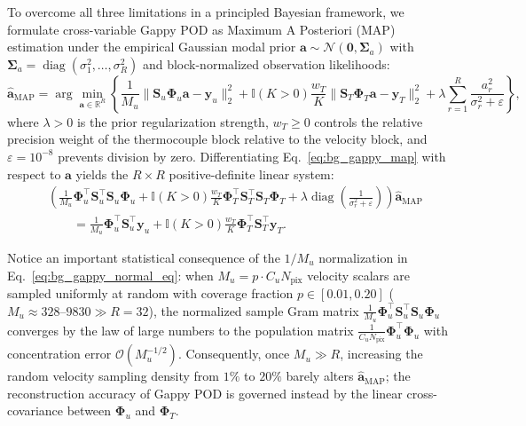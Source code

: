 To overcome all three limitations in a principled Bayesian framework, we formulate cross-variable Gappy POD as Maximum A Posteriori (MAP) estimation under the empirical Gaussian modal prior $\mathbf{a} \sim \mathcal{N}(\mathbf{0}, \boldsymbol{\Sigma}_a)$ with $\boldsymbol{\Sigma}_a = \operatorname{diag}(\sigma_1^2, \dots, \sigma_R^2)$ and block-normalized observation likelihoods:
\begin{equation}
    \hat{\mathbf{a}}_{\text{MAP}} = \arg\min_{\mathbf{a} \in \mathbb{R}^R} \left\{ \frac{1}{M_u} \|\mathbf{S}_u \boldsymbol{\Phi}_u \mathbf{a} - \mathbf{y}_u\|_2^2 + \mathbb{I}(K > 0) \frac{w_T}{K} \|\mathbf{S}_T \boldsymbol{\Phi}_T \mathbf{a} - \mathbf{y}_T\|_2^2 + \lambda \sum_{r=1}^R \frac{a_r^2}{\sigma_r^2 + \varepsilon} \right\},
    \label{eq:bg_gappy_map}
\end{equation}
where $\lambda > 0$ is the prior regularization strength, $w_T \ge 0$ controls the relative precision weight of the thermocouple block relative to the velocity block, and $\varepsilon = 10^{-8}$ prevents division by zero. Differentiating Eq.~\eqref{eq:bg_gappy_map} with respect to $\mathbf{a}$ yields the $R \times R$ positive-definite linear system:
\begin{equation}
\begin{aligned}
    &\left( \frac{1}{M_u}\boldsymbol{\Phi}_u^\top \mathbf{S}_u^\top \mathbf{S}_u \boldsymbol{\Phi}_u + \mathbb{I}(K > 0)\frac{w_T}{K}\boldsymbol{\Phi}_T^\top \mathbf{S}_T^\top \mathbf{S}_T \boldsymbol{\Phi}_T + \lambda \operatorname{diag}\!\left(\frac{1}{\sigma_r^2 + \varepsilon}\right) \right) \hat{\mathbf{a}}_{\text{MAP}} \\
    &\qquad = \frac{1}{M_u}\boldsymbol{\Phi}_u^\top \mathbf{S}_u^\top \mathbf{y}_u + \mathbb{I}(K > 0)\frac{w_T}{K}\boldsymbol{\Phi}_T^\top \mathbf{S}_T^\top \mathbf{y}_T.
\end{aligned}
\label{eq:bg_gappy_normal_eq}
\end{equation}

Notice an important statistical consequence of the $1/M_u$ normalization in Eq.~\eqref{eq:bg_gappy_normal_eq}: when $M_u = p \cdot C_u N_{\text{pix}}$ velocity scalars are sampled uniformly at random with coverage fraction $p \in [0.01, 0.20]$ ($M_u \approx 328\text{--}9830 \gg R = 32$), the normalized sample Gram matrix $\frac{1}{M_u}\boldsymbol{\Phi}_u^\top \mathbf{S}_u^\top \mathbf{S}_u \boldsymbol{\Phi}_u$ converges by the law of large numbers to the population matrix $\frac{1}{C_u N_{\text{pix}}}\boldsymbol{\Phi}_u^\top \boldsymbol{\Phi}_u$ with concentration error $\mathcal{O}(M_u^{-1/2})$. Consequently, once $M_u \gg R$, increasing the random velocity sampling density from $1\%$ to $20\%$ barely alters $\hat{\mathbf{a}}_{\text{MAP}}$; the reconstruction accuracy of Gappy POD is governed instead by the linear cross-covariance between $\boldsymbol{\Phi}_u$ and $\boldsymbol{\Phi}_T$.

